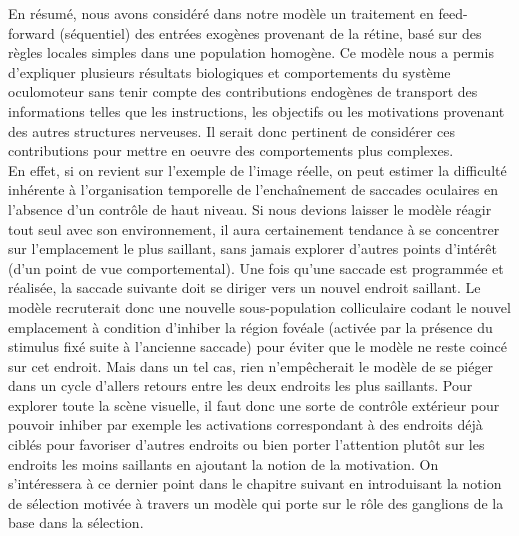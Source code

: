 En résumé, nous avons considéré dans notre modèle un traitement en feed-forward (séquentiel) des entrées exogènes provenant de la rétine, basé sur des règles locales simples dans une population homogène. Ce modèle nous a permis d'expliquer plusieurs résultats biologiques et comportements du système oculomoteur sans tenir compte des contributions endogènes de transport des informations telles que les instructions, les objectifs ou les motivations provenant des autres structures nerveuses. Il serait donc pertinent de considérer ces contributions pour mettre en oeuvre des comportements plus complexes.\\

En effet, si on revient sur l'exemple de l'image réelle, on peut estimer la difficulté inhérente à l'organisation temporelle de l'enchaînement de saccades oculaires en l'absence d'un contrôle de haut niveau. Si nous devions laisser le modèle réagir tout seul avec son environnement, il aura certainement tendance à se concentrer sur l'emplacement le plus saillant, sans jamais explorer d'autres points d'intérêt (d'un point de vue comportemental). Une fois qu'une saccade est programmée et réalisée, la saccade suivante doit se diriger vers un nouvel endroit saillant. Le modèle recruterait donc une nouvelle sous-population colliculaire codant le nouvel emplacement à condition d'inhiber la région fovéale (activée par la présence du stimulus fixé suite à l'ancienne saccade) pour éviter que le modèle ne reste coincé sur cet endroit. Mais dans un tel cas, rien n'empêcherait le modèle de se piéger dans un cycle d'allers retours entre les deux endroits les plus saillants. Pour explorer toute la scène visuelle, il faut donc une sorte de contrôle extérieur pour pouvoir inhiber par exemple les activations correspondant à des endroits déjà ciblés pour favoriser d'autres endroits \cite {Fix:2006} ou bien porter l'attention plutôt sur les endroits les moins saillants en ajoutant la notion de la motivation. On s'intéressera à ce dernier point dans le chapitre suivant en introduisant la notion de sélection motivée à travers un modèle qui porte sur le rôle des ganglions de la base dans la sélection.\\


